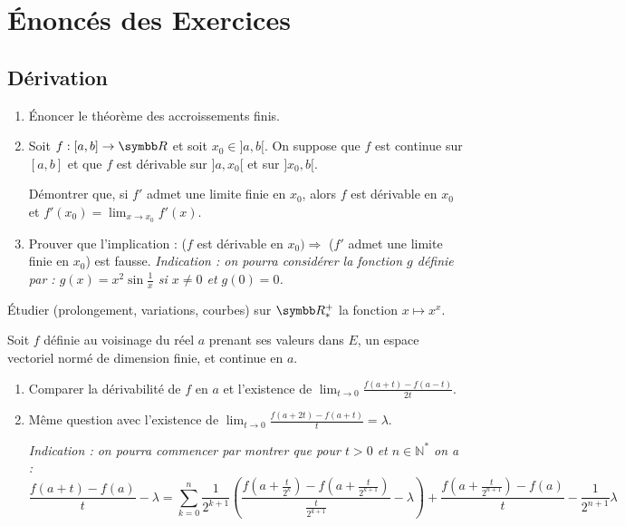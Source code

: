 \section{Énoncés des Exercices}
\subsection{Dérivation}

\begin{exercice}
\begin{enumerate}
    \item Énoncer le théorème des accroissements finis.
    \item Soit $f:[a,b]\to \R$ et soit $x_{0}\in]a,b[$. 
        On suppose que $f$ est continue sur $[a, b]$ et que $f$ est dérivable sur $]a, x_{0}[$ et sur $]x_{0}, b[$.

        Démontrer que, si $f'$ admet une limite finie en $x_{0}$, alors $f$ est dérivable en $x_{0}$ et $f'(x_{0})=\lim_{x\rightarrow x_{0}}f'(x)$.
    \item Prouver que l'implication : ($f$ est dérivable en $x_{0}) \Rightarrow$ ($f'$ admet une limite finie en $x_{0}$) est fausse.
        \textit{Indication : on pourra considérer la fonction $g$ définie par : $g(x)=x^{2}\sin\frac{1}{x}$ si $x\ne0$ et $g(0)=0$.}
\end{enumerate}
\end{exercice}

\begin{exercice}
    Étudier (prolongement, variations, courbes) sur $\R^{+}_*$ la fonction $x\mapsto x^{x}$.
\end{exercice}

\begin{exercice}
Soit $f$ définie au voisinage du réel $a$ prenant ses valeurs dans $E$, un espace vectoriel normé de dimension finie, et continue en $a$.
\begin{enumerate}
    \item Comparer la dérivabilité de $f$ en $a$ et l'existence de $\lim_{t\rightarrow0}\frac{f(a+t)-f(a-t)}{2t}$.
    \item Même question avec l'existence de $\lim_{t\rightarrow0}\frac{f(a+2t)-f(a+t)}{t}=\lambda$.
    
    \textit{Indication : on pourra commencer par montrer que pour $t>0$ et $n\in\mathbb{N}^{*}$ on a :}
    \[\frac{f(a+t)-f(a)}{t} - \lambda = \sum_{k=0}^{n}\frac{1}{2^{k+1}}\left(\frac{f\left(a+\frac{t}{2^{k}}\right)-f\left(a+\frac{t}{2^{k+1}}\right)}{\frac{t}{2^{k+1}}} - \lambda\right) + \frac{f\left(a+\frac{t}{2^{n+1}}\right)-f(a)}{t} - \frac{1}{2^{n+1}}\lambda\]
\end{enumerate}
\end{exercice}

